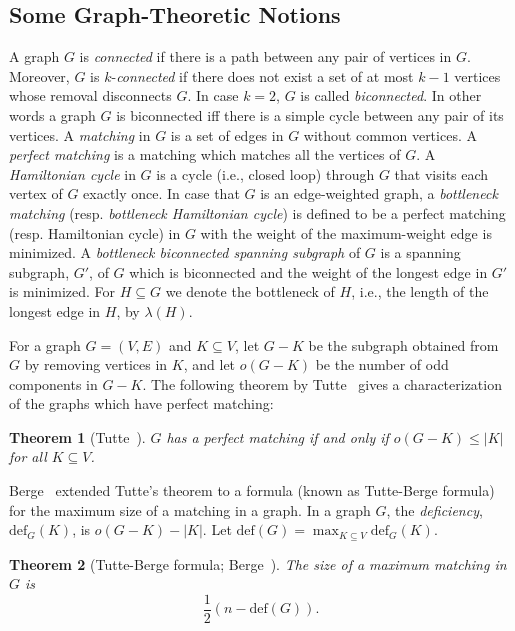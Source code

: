 \documentclass[11pt,a4paper]{article}
\newtheorem{theorem}{Theorem}
\begin{document}
\subsection{Some Graph-Theoretic Notions}
\label{graph-notions}
A graph $G$ is {\em connected} if there is a path between any pair of vertices in $G$. Moreover, $G$ is $k$-{\em connected} if there does not exist a set of at most $k-1$ vertices whose removal disconnects $G$. In case $k=2$, $G$ is called {\em biconnected}. In other words a graph $G$ is biconnected iff there is a simple cycle between any pair of its vertices. A {\em matching} in $G$ is a set of edges in $G$ without common vertices. A {\em perfect matching} is a matching which matches all the vertices of $G$. A {\em Hamiltonian cycle} in $G$ is a cycle (i.e., closed loop) through $G$ that visits each vertex of $G$ exactly once.
In case that $G$ is an edge-weighted graph, a {\em bottleneck matching} (resp. {\em bottleneck Hamiltonian cycle}) is defined to be a perfect matching (resp. Hamiltonian cycle) in $G$ with the weight of the maximum-weight edge is minimized. A {\em bottleneck biconnected spanning subgraph} of $G$ is a spanning subgraph, $G'$, of $G$ which is biconnected and the weight of the longest edge in $G'$ is minimized. For $H\subseteq G$ we denote the bottleneck of $H$, i.e., the length of the longest edge in $H$, by $\lambda(H)$.

 
For a graph $G=(V,E)$ and $K\subseteq V$, let $G-K$ be the subgraph obtained from $G$ by removing vertices in $K$, and let $o(G-K)$ be the number of odd components in $G-K$. The following theorem by Tutte~\cite{Tutte1947} gives a characterization of the graphs which have perfect matching: 

\begin{theorem}[Tutte~\cite{Tutte1947}] 
\label{Tutte} 
$G$ has a perfect matching if and only if $o(G-K)\le |K|$ for all $K\subseteq V$.
\end{theorem}

Berge~\cite{Berge1958} extended Tutte’s theorem to a formula (known as Tutte-Berge formula) for the maximum size of a matching in a graph. In a graph $G$, the {\em deficiency}, $\text{def}_G(K)$, is $o(G-K)-|K|$. Let $\text{def}(G)=\max_{K\subseteq V}{\text{def}_G(K)}$.


\begin{theorem}[Tutte-Berge formula; Berge~\cite{Berge1958}] 
\label{Berge} 
The size of a maximum matching in $G$ is $$\frac{1}{2}(n-\mathrm{def}(G)).$$
\end{theorem}
\end{document}
